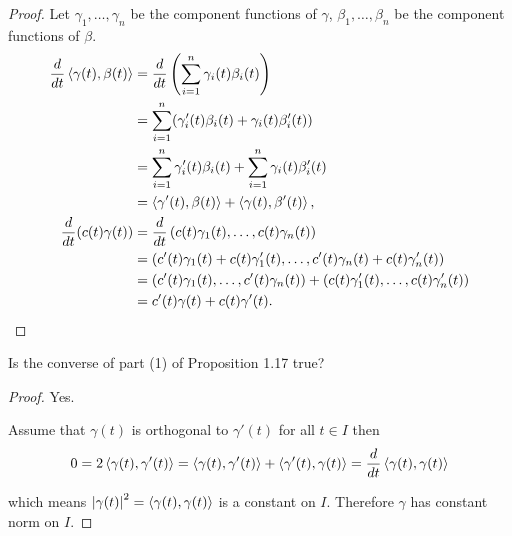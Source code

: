 \begin{proof}
	Let $\gamma_{1}, \ldots, \gamma_{n}$ be the component functions of $\gamma$, $\beta_{1}, \ldots, \beta_{n}$ be the component functions of $\beta$.
	\begin{align*}
		\frac{d}{dt}\left\langle{\gamma(t), \beta(t)}\right\rangle & = \frac{d}{dt}\left(\sum^{n}_{i=1}\gamma_{i}(t)\beta_{i}(t)\right)                                                \\
		                                            & = \sum^{n}_{i=1}(\gamma_{i}'(t)\beta_{i}(t) + \gamma_{i}(t)\beta_{i}'(t))                                         \\
		                                            & = \sum^{n}_{i=1}\gamma_{i}'(t)\beta_{i}(t) + \sum^{n}_{i=1}\gamma_{i}(t)\beta_{i}'(t)                             \\
		                                            & = \left\langle{\gamma'(t), \beta(t)}\right\rangle + \left\langle{\gamma(t), \beta'(t)}\right\rangle,                                            \\
		\frac{d}{dt}(c(t)\gamma(t))                 & = \frac{d}{dt}\left({c(t)\gamma_{1}(t), \ldots, c(t)\gamma_{n}(t)}\right)                                                \\
		                                            & = \left({c'(t)\gamma_{1}(t) + c(t)\gamma_{1}'(t), \ldots, c'(t)\gamma_{n}(t) + c(t)\gamma_{n}'(t)}\right)                \\
		                                            & = \left({c'(t)\gamma_{1}(t), \ldots, c'(t)\gamma_{n}(t)}\right) + \left({c(t)\gamma_{1}'(t), \ldots, c(t)\gamma_{n}'(t)}\right) \\
		                                            & = c'(t)\gamma(t) + c(t)\gamma'(t).\qedhere
	\end{align*}
\end{proof}

\begin{exercise}{1.22}
	Is the converse of part (1) of Proposition 1.17 true?
\end{exercise}

\begin{proof}
	Yes.

	Assume that $\gamma(t)$ is orthogonal to $\gamma'(t)$ for all $t\in I$ then
	\begin{align*}
		0 = 2\left\langle{\gamma(t), \gamma'(t)}\right\rangle = \left\langle{\gamma(t), \gamma'(t)}\right\rangle + \left\langle{\gamma'(t), \gamma(t)}\right\rangle = \frac{d}{dt}\left\langle{\gamma(t), \gamma(t)}\right\rangle
	\end{align*}

	which means $\left\vert{\gamma(t)}\right\vert^{2} = \left\langle{\gamma(t), \gamma(t)}\right\rangle$ is a constant on $I$. Therefore $\gamma$ has constant norm on $I$.
\end{proof}

